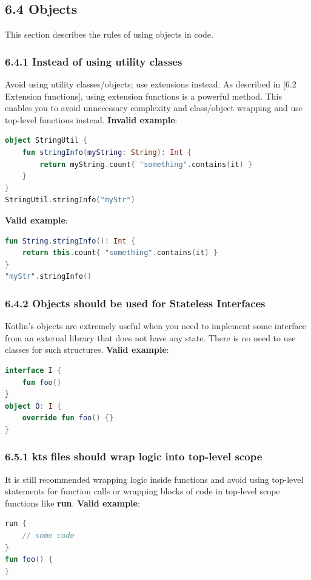 \subsection*{\textbf{6.4 Objects}}
\label{sec:6.4}
This section describes the rules of using objects in code.
\subsubsection*{\textbf{6.4.1 Instead of using utility classes}}
\leavevmode\newline
\label{sec:6.4.1}
Avoid using utility classes/objects; use extensions instead. As described in [6.2 Extension functions], using extension functions is a powerful method.
This enables you to avoid unnecessary complexity and class/object wrapping and use top-level functions instead.
\textbf{Invalid example}:
\begin{lstlisting}[language=Kotlin]
object StringUtil {
    fun stringInfo(myString: String): Int {
        return myString.count{ "something".contains(it) }
    }
}
StringUtil.stringInfo("myStr")
\end{lstlisting}
\textbf{Valid example}:
\begin{lstlisting}[language=Kotlin]
fun String.stringInfo(): Int {
    return this.count{ "something".contains(it) }
}
"myStr".stringInfo()
\end{lstlisting}
\subsubsection*{\textbf{6.4.2 Objects should be used for Stateless Interfaces}}
\leavevmode\newline
\label{sec:6.4.2}
Kotlin’s objects are extremely useful when you need to implement some interface from an external library that does not have any state.
There is no need to use classes for such structures.
\textbf{Valid example}:
\begin{lstlisting}[language=Kotlin]
interface I {
    fun foo()
}
object O: I {
    override fun foo() {}
}
\end{lstlisting}
\subsubsection*{\textbf{6.5.1 kts files should wrap logic into top-level scope}}
\leavevmode\newline
\label{sec:6.5.1}
It is still recommended wrapping logic inside functions and avoid using top-level statements for function calls or wrapping blocks of code
in top-level scope functions like \textbf{run}.
\textbf{Valid example}:
\begin{lstlisting}[language=Kotlin]
run {
    // some code
}
fun foo() {
}
\end{lstlisting}
